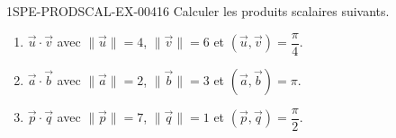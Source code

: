 \begin{exercice}{1SPE-PRODSCAL-EX-004}{1}{6}
Calculer les produits scalaires suivants.
\begin{enumerate}
  \item $\vec{u} \cdot \vec{v}$ avec $\|\vec{u}\| = 4$, $\|\vec{v}\| = 6$ et $(\vec{u}, \vec{v}) = \dfrac{\pi}{4}$.
  \item $\vec{a} \cdot \vec{b}$ avec $\|\vec{a}\| = 2$, $\|\vec{b}\| = 3$ et $(\vec{a}, \vec{b}) = \pi$.
  \item $\vec{p} \cdot \vec{q}$ avec $\|\vec{p}\| = 7$, $\|\vec{q}\| = 1$ et $(\vec{p}, \vec{q}) = \dfrac{\pi}{2}$.
\end{enumerate}
\end{exercice}
